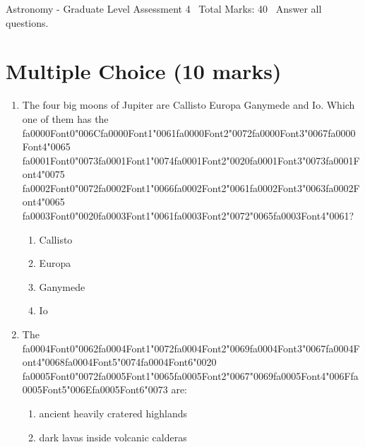 \documentclass[12pt]{article}
\begin{document}
\begin{center}
Astronomy - Graduate Level Assessment 4 \
Total Marks: 40 \
Answer all questions.
\end{center}

\section*{Multiple Choice (10 marks)}
\begin{enumerate}[label=\arabic*.]
\item The four big moons of Jupiter are Callisto Europa Ganymede and Io. Which one of them has
the {\csname fa0000Font0\endcsname\char"006C}{\csname fa0000Font1\endcsname\char"0061}{\csname fa0000Font2\endcsname\char"0072}{\csname fa0000Font3\endcsname\char"0067}{\csname fa0000Font4\endcsname\char"0065} {\csname fa0001Font0\endcsname\char"0073}{\csname fa0001Font1\endcsname\char"0074}{\csname fa0001Font2\endcsname\char"0020}{\csname fa0001Font3\endcsname\char"0073}{\csname fa0001Font4\endcsname\char"0075} {\csname fa0002Font0\endcsname\char"0072}{\csname fa0002Font1\endcsname\char"0066}{\csname fa0002Font2\endcsname\char"0061}{\csname fa0002Font3\endcsname\char"0063}{\csname fa0002Font4\endcsname\char"0065} {\csname fa0003Font0\endcsname\char"0020}{\csname fa0003Font1\endcsname\char"0061}{\csname fa0003Font2\endcsname\char"0072}{\char"0065}{\csname fa0003Font4\endcsname\char"0061}?
\begin{enumerate}[label=(\alph*)]
    \item Callisto
    \item Europa
    \item Ganymede
    \item Io
\end{enumerate}
\item The {\csname fa0004Font0\endcsname\char"0062}{\csname fa0004Font1\endcsname\char"0072}{\csname fa0004Font2\endcsname\char"0069}{\csname fa0004Font3\endcsname\char"0067}{\csname fa0004Font4\endcsname\char"0068}{\csname fa0004Font5\endcsname\char"0074}{\csname fa0004Font6\endcsname\char"0020} {\csname fa0005Font0\endcsname\char"0072}{\csname fa0005Font1\endcsname\char"0065}{\csname fa0005Font2\endcsname\char"0067}{\char"0069}{\csname fa0005Font4\endcsname\char"006F}{\csname fa0005Font5\endcsname\char"006E}{\csname fa0005Font6\endcsname\char"0073} are:
\begin{enumerate}[label=(\alph*)]
    \item ancient heavily cratered highlands
    \item dark lavas inside volcanic calderas

\end{enumerate}
\end{enumerate}
\end{document}
